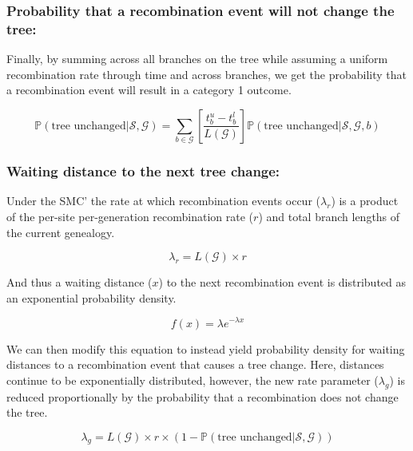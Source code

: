 \documentclass[11pt]{article}
\begin{document}
\subsubsection{Probability that a recombination event will not change the tree:}
Finally, by summing across all branches on the tree while assuming a uniform 
recombination rate through time and across branches, we get the
probability that a recombination event will result in a category 1 outcome.

\begin{equation}
	\mathbb{P}(\textrm{tree unchanged} | \mathcal{S},\mathcal{G}) = 
	\sum_{b \in \mathcal{G}}
	\left[\frac{t^u_b - t^l_b}{L(\mathcal{G})}\right]
	\mathbb{P}(\textrm{tree unchanged} | \mathcal{S},\mathcal{G},b)
\end{equation}

\subsubsection{Waiting distance to the next tree change:}
Under the SMC' the rate at which recombination events occur ($\lambda_r$)
is a product of the per-site per-generation recombination rate ($r$) and 
total branch lengths of the current genealogy.

\begin{equation}
	\lambda_{r} = L(\mathcal{G}) \times r
\end{equation}

\noindent And thus a waiting distance ($x$) to the next recombination event 
is distributed as an exponential probability density.

\begin{equation}
	f(x) = \lambda e^{-\lambda x}
\end{equation}

\noindent We can then modify this equation to instead yield probability
density for waiting distances to a recombination event that causes a 
tree change. 
Here, distances continue to be exponentially distributed, however, 
the new rate parameter ($\lambda_g$) is reduced proportionally by 
the probability that a recombination does not change the tree.

\begin{equation}
	\lambda_{g} = 
	L(\mathcal{G}) \times r \times 
	(1 - \mathbb{P}(\text{tree unchanged}|\mathcal{S},\mathcal{G}))
\end{equation}

\end{document}
